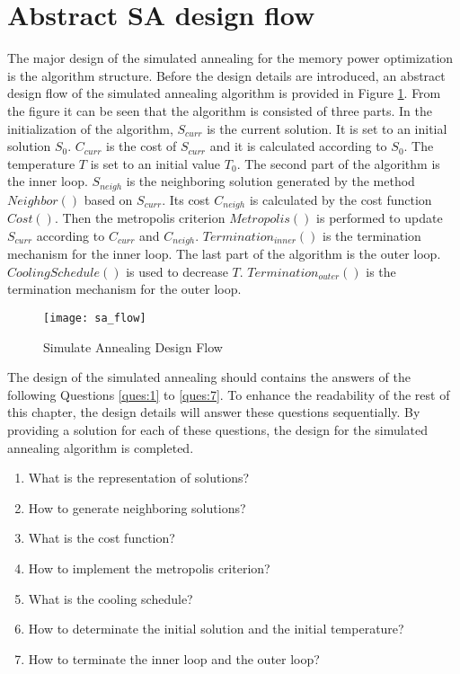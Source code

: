 	\section{Abstract SA design flow}
	\label{sec:sa_design_flow}
	The major design of the simulated annealing for the memory power optimization is
	the algorithm structure. Before the design details are introduced, an abstract
	design flow of the simulated annealing algorithm is provided in Figure
	\ref{fig:sa_framwork}. From the figure it can be seen that the algorithm is
	consisted of three parts.
	In the initialization of the algorithm, $S_{curr}$ is
	the current solution. It is set to an initial solution $S_{0}$. $C_{curr}$ is the
	cost of $S_{curr}$ and it is calculated according to $S_{0}$. The temperature
	$T$ is set to an initial value $T_{0}$.
	The second part of the algorithm is the inner loop. $S_{neigh}$ is the neighboring
	solution generated by the method $Neighbor()$ based on $S_{curr}$. Its cost
	$C_{neigh}$ is calculated by the cost function $Cost()$. Then the metropolis
	criterion $Metropolis()$ is performed to update $S_{curr}$ according
	to $C_{curr}$ and $C_{neigh}$.
	$Termination_{inner}()$ is the termination mechanism for the inner loop.
	The last part of the algorithm is the outer loop. $CoolingSchedule()$ is used to
	decrease $T$. $Termination_{outer}()$ is the termination mechanism for the outer loop.
	\begin{figure}[htb]
		\begin{center}
			\texttt{[image: sa\_flow]}
			\caption{Simulate Annealing Design Flow}
			\label{fig:sa_framwork}
		\end{center}
	\end{figure}	

	The design of the simulated annealing should contains the answers of the following
	Questions \ref{ques:1} to \ref{ques:7}. To enhance the readability of the rest of this
	chapter, the design details will answer these questions sequentially.
	By providing a solution for each of these questions, the design for the
	simulated annealing algorithm is completed.
	\begin{enumerate} 
		\item What is the representation of solutions?
		\label{ques:1}
		\item How to generate neighboring solutions?
		\label{ques:2}
		\item What is the cost function?
		\label{ques:3}
		\item How to implement the metropolis criterion?
		\label{ques:4}
		\item What is the cooling schedule?
		\label{ques:5}
		\item How to determinate the initial solution and the initial temperature?
		\label{ques:6}
		\item How to terminate the inner loop and the outer loop?
		\label{ques:7}
	\end{enumerate}


